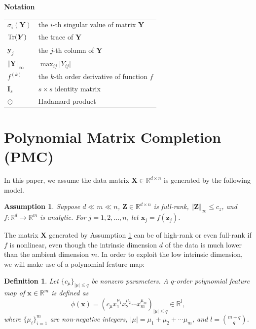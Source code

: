 \documentclass[letterpaper]{article} %
\newtheorem{assumption}{Assumption}
\newtheorem{definition}{Definition}
\begin{document}
\textbf{Notation}
\begin{table}[h!]
\centering
\begin{tabular}{ll}
\hline
$\sigma_i(\bm{Y})$ &the $i$-th singular value of matrix $\bm{Y}$ \\
$\textup{Tr}(\bm{Y})$ & the trace of $\bm{Y}$\\
$\bm{y}_j$ &the $j$-th column of $\bm{Y}$ \\
$\Vert\bm{Y}\Vert_\infty$ &$\max_{ij}\vert Y_{ij}\vert$\\
$f^{(k)}$& the $k$-th order derivative of function $f$\\
$\bm{I}_s$& $s\times s$ identity matrix\\
$\odot$	&Hadamard product \\
\hline
\end{tabular}
\end{table}





\section{Polynomial Matrix Completion (PMC)}
In this paper, we assume the data matrix $\bm{X} \in \mathbb{R}^{d\times n}$
is generated by the following model.
\begin{assumption}\label{asp_fz_analytic}
Suppose $d\ll m\ll n$, $\bm{Z}\in\mathbb{R}^{d\times n}$ is full-rank, $\Vert \bm{Z}\Vert_\infty\leq c_z$, and $f:\mathbb{R}^d\rightarrow\mathbb{R}^m$ is analytic. For $j=1,2,\ldots,n$, let $\bm{x}_j=f(\bm{z}_j)$.
\end{assumption}
The matrix $\bm{X}$ generated by Assumption \ref{asp_fz_analytic}
can be of high-rank or even full-rank if $f$ is nonlinear,
even though the intrinsic dimension $d$ of the data is much lower than the ambient dimension $m$.
In order to exploit the low intrinsic dimension,
we will make use of a polynomial feature map:
\begin{definition}\label{def_phi}
Let $\lbrace c_\mu\rbrace_{\vert\mu\vert\leq q}$ be nonzero parameters. A $q$-order polynomial feature map of $\bm{x}\in\mathbb{R}^m$ is defined as
$$\phi(\bm{x})=(c_{\mu}x_1^{\mu_1}x_2^{\mu_2}\cdots x_m^{\mu_m})_{\vert\mu\vert\leq q}\in\mathbb{R}^l,$$
where $\lbrace\mu_i\rbrace_{i=1}^m$ are non-negative integers, $\vert\mu\vert=\mu_1+\mu_2+\cdots\mu_m$, and $l=\binom{m+q}{q}$.
\end{definition}
\end{document}
